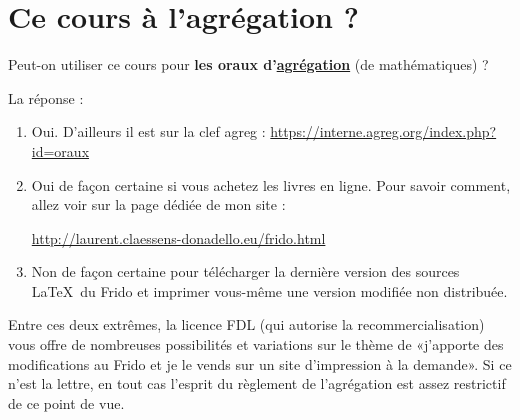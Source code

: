 
\section*{Ce cours à l'agrégation ?}

Peut-on utiliser ce cours pour \textbf{les oraux d'\href{http://agreg.org/}{agrégation}} (de mathématiques) ?

La réponse :
\begin{enumerate}
    \item
        Oui. D'ailleurs il est sur la clef agreg : \url{https://interne.agreg.org/index.php?id=oraux}
    \item
        Oui de façon certaine si vous achetez les livres en ligne. Pour savoir comment, allez voir sur la page dédiée de mon site :
        \begin{center}
            \url{http://laurent.claessens-donadello.eu/frido.html}
        \end{center}
    \item
        Non de façon certaine pour télécharger la dernière version des sources \LaTeX\ du Frido et imprimer vous-même une version modifiée non distribuée.
\end{enumerate}
Entre ces deux extrêmes, la licence FDL (qui autorise la recommercialisation) vous offre de nombreuses possibilités et variations sur le thème de «j'apporte des modifications au Frido et je le vends sur un site d'impression à la demande». Si ce n'est la lettre, en tout cas l'esprit du règlement de l'agrégation est assez restrictif de ce point de vue.
